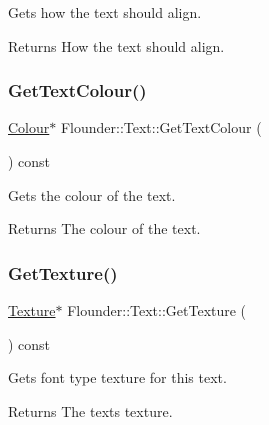Gets how the text should align. 

\begin{DoxyReturn}{Returns}
How the text should align. 
\end{DoxyReturn}
\mbox{\label{class_flounder_1_1_text_ad1632fa01c84e96fbd2c30ae0848ab87}} 
\subsubsection{\texorpdfstring{Get\+Text\+Colour()}{GetTextColour()}}
{\footnotesize\ttfamily \hyperlink{class_flounder_1_1_colour}{Colour}$\ast$ Flounder\+::\+Text\+::\+Get\+Text\+Colour (\begin{DoxyParamCaption}{ }\end{DoxyParamCaption}) const\hspace{0.3cm}{\ttfamily [inline]}}



Gets the colour of the text. 

\begin{DoxyReturn}{Returns}
The colour of the text. 
\end{DoxyReturn}
\mbox{\label{class_flounder_1_1_text_ae3841a5346a2f455fce161f0edb8b2d4}} 
\subsubsection{\texorpdfstring{Get\+Texture()}{GetTexture()}}
{\footnotesize\ttfamily \hyperlink{class_flounder_1_1_texture}{Texture}$\ast$ Flounder\+::\+Text\+::\+Get\+Texture (\begin{DoxyParamCaption}{ }\end{DoxyParamCaption}) const\hspace{0.3cm}{\ttfamily [inline]}}



Gets font type texture for this text. 

\begin{DoxyReturn}{Returns}
The texts texture. 
\end{DoxyReturn}
\mbox{\label{class_flounder_1_1_text_a3e0dbe3cd70c7c66de11d336d2268870}} 
